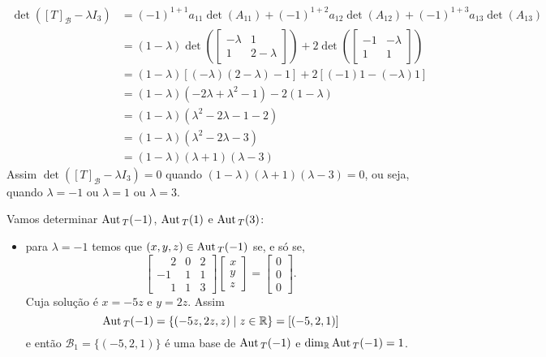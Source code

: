 \begin{exemplo}
\begin{enumerate}[label={\arabic*})]
\begin{solucao}
\begin{align*}
                    \det([T]_\mathcal{B} - \lambda I_3) &= (-1)^{1 + 1}a_{11}\det(A_{11}) + (-1)^{1 + 2}a_{12}\det(A_{12}) + (-1)^{1 + 3}a_{13}\det(A_{13}) \\ &= (1 - \lambda)\det\left(\begin{bmatrix}-\lambda & 1\\1 & 2 - \lambda\end{bmatrix}\right) + 2\det\left(\begin{bmatrix}-1 & -\lambda\\1 & 1\end{bmatrix}\right) \\ &= (1 - \lambda)[(-\lambda)(2 - \lambda) - 1] + 2[(-1)1 - (-\lambda)1] \\ &= (1 - \lambda)(-2\lambda + \lambda^2 - 1) - 2(1 - \lambda) \\ &= (1 - \lambda)(\lambda^2 - 2\lambda - 1 - 2) \\ &= ( 1 -\lambda)(\lambda^2 - 2\lambda - 3) \\ &= (1 - \lambda)(\lambda + 1)(\lambda - 3) 
                \end{align*}
                Assim $\det([T]_\mathcal{B} - \lambda I_3) = 0$ quando $(1 - \lambda)(\lambda + 1)(\lambda - 3) = 0$, ou seja, quando $\lambda = -1$ ou $\lambda = 1$ ou $\lambda = 3$.

                Vamos determinar ${\rm Aut\,}_T(-1)$, ${\rm Aut\,}_T(1)$ e ${\rm Aut\,}_T(3)$:
                \begin{itemize}
                    \item para $\lambda = -1$ temos que $(x,y,z) \in {\rm Aut\,}_T(-1)$ se, e s\'o se,
                        \[
                            \begin{bmatrix}
                                \phantom{-}2 & 0 & 2\\
                                -1 & 1 & 1\\
                                \phantom{-}1 & 1 & 3
                            \end{bmatrix}\begin{bmatrix}
                                x\\y\\z
                            \end{bmatrix} = \begin{bmatrix}
                                0\\0\\0
                            \end{bmatrix}.
                        \]
                        Cuja solu\c{c}ão é $x = -5z$ e $y = 2z$. Assim
                        \[
                            {\rm Aut\,}_T(-1) = \{(-5z,2z,z) \mid z \in \mathbb{R}\} = [(-5,2,1)]
                        \]
                        e ent\~ao $\mathcal{B}_1 = \{(-5,2,1)\}$ \'e uma base de ${\rm Aut\,}_T(-1)$ e $\dim_{\mathbb{R}}{\rm Aut\,}_T(-1) = 1$.


\end{itemize}
\end{solucao}
\end{enumerate}
\end{exemplo}
